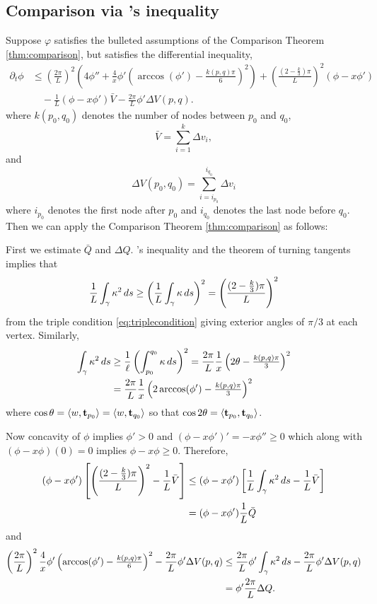 \documentclass[11pt]{amsart}
\begin{document}
\subsection{Comparison via \holder's inequality}

Suppose  $\varphi$ satisfies the bulleted assumptions of the Comparison Theorem \ref{thm:comparison}, but satisfies the differential inequality,
\[
\begin{split}
\partial_t \phi &\leq \left(\frac{2\pi}{L}\right)^2 \left(4 \phi'' + \frac{4}{x} \phi' \left(\arccos(\phi') - \tfrac{k(p,q)\pi}{6}\right)^2\right) + \left(\frac{(2 - \tfrac{k}{3})\pi}{L}\right)^2 \left(\phi - x \phi'\right) \\
&\quad - \frac{1}{L} (\phi - x\phi') \bar{V} - \frac{2\pi}{L} \phi' \Delta V (p,q).
\end{split}
\]
where $k(p_0, q_0)$ denotes the number of nodes between $p_0$ and $q_0$,
\[
\bar{V} = \sum_{i=1}^k \Delta v_i,
\]
and
\[
\Delta V (p_0, q_0) = \sum_{i = i_{p_0}}^{i_{q_0}} \Delta v_i
\]
where $i_{p_0}$ denotes the first node after $p_0$ and $i_{q_0}$ denotes the last node before $q_0$. Then we can apply the Comparison Theorem \ref{thm:comparison} as follows:

First we estimate $\bar{Q}$ and $\Delta Q$. \holder's inequality and the theorem of turning tangents implies that
\[
\frac{1}{L} \int_{\gamma} \operatorname{\kappa}^2 ds \geq \left(\frac{1}{L}\int_{\gamma} \operatorname{\kappa} ds\right)^2 = \left(\frac{(2 - \tfrac{k}{3})\pi}{L}\right)^2
\]
from the triple condition \eqref{eq:triplecondition} giving exterior angles of $\pi/3$ at each vertex. Similarly,
\[
\begin{split}
\int_{\gamma} \operatorname{\kappa}^2 ds &\geq \frac{1}{\ell} \left(\int_{p_0}^{q_0} \operatorname{\kappa} ds\right)^2 = \frac{2\pi}{L} \frac{1}{x} \left(2\theta - \tfrac{k(p,q)\pi}{3}\right)^2 \\
&= \frac{2\pi}{L} \frac{1}{x} \left(2\arccos(\phi') - \tfrac{k(p,q)\pi}{3}\right)^2
\end{split}
\]
where $\cos \theta = \langle{w},{\operatorname{\mathbf{t}}_{p_0}}\rangle = \langle{w},{\operatorname{\mathbf{t}}_{q_0}}\rangle$ so that $\cos 2 \theta = \langle{\operatorname{\mathbf{t}}_{p_0}},{\operatorname{\mathbf{t}}_{q_0}}\rangle$.

Now concavity of $\phi$ implies $\phi' > 0$ and $(\phi - x \phi')' = -x\phi'' \geq 0$ which along with $(\phi - x\phi) (0) = 0$ implies $\phi -x \phi \geq 0$. Therefore,
\[
\begin{split}
(\phi - x\phi') \left[\left(\frac{(2 - \tfrac{k}{3})\pi}{L}\right)^2 - \frac{1}{L} \bar{V}\right] &\leq (\phi - x\phi') \left[\frac{1}{L} \int_{\gamma} \operatorname{\kappa}^2 ds - \frac{1}{L} \bar{V}\right] \\
&= (\phi - x\phi') \frac{1}{L} \bar{Q}
\end{split}
\]
and
\[
\begin{split}
\left(\frac{2\pi}{L}\right)^2 \frac{4}{x} \phi' \left(\arccos(\phi') - \tfrac{k(p,q)\pi}{6}\right)^2 - \frac{2\pi}{L} \phi' \Delta V (p,q) &\leq \frac{2\pi}{L} \phi' \int_{\gamma} \operatorname{\kappa}^2 ds - \frac{2\pi}{L} \phi' \Delta V (p,q) \\
&= \phi' \frac{2\pi}{L} \Delta Q.
\end{split}
\]
\end{document}
